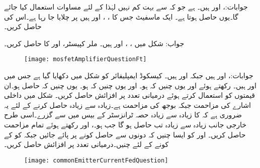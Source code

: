 جوابات:، اور  ہیں۔ ہے جو کہ  سے بہت کم نہیں لہٰذا  کے لئے مساوات  استعمال کیا جائے گا۔یوں  حاصل ہوتا ہے۔ 
ایک ماسفیٹ جس کا ، ، اور  ہیں  پر چلایا جا رہا ہے۔اس کی  حاصل کریں۔

جواب:
شکل  میں ، ،  اور  ہیں۔ ملر کپیسٹر،  اور  کا   حاصل کریں۔
\begin{figure}
\centering
\texttt{[image: mosfetAmplifierQuestionFt]}
\caption{}
\label{شکل_تعددی_ردعمل_سوال_ایف_ٹی}
\end{figure}

جوابات:،  اور ہیں جبکہ  اور  ہیں۔
کیسکوڈ ایمپلیفائر کو شکل  میں دکھایا گیا ہے جس میں  اور  ہیں۔ رکھتے ہوئے  اور  یوں چنیں کہ  ہو۔ اور  یوں چنیں کہ  ہو۔ یوں چنیں کہ  حاصل ہو۔ان قیمتوں کو استعمال کرتے ہوئے درمیانی تعدد پر افزائش  حاصل کریں۔
شکل  میں داخلی اشارے کی مزاحمت  جبکہ بوجھ کی مزاحمت  ہے۔زیادہ سے زیادہ  حاصل کرنے کے لئے یہ ضروری ہے کہ  کا زیادہ سے زیادہ حصہ ٹرانزسٹر کے بیس  میں سے گزرے۔اسی طرح خارجی جانب زیادہ سے زیادہ  تب حاصل ہو گا جب  ہو۔،  اور  رکھتے ہوئے  تمام مزاحمت حاصل کریں۔ اور  کو ایسا چنیں کہ دونوں سے حاصل کونے  پر پائے جائیں جبکہ  کو  کے کونے کے لئے چنیں۔درمیانی تعدد پر افزائش  حاصل کریں۔ 
\begin{figure}
\centering
\texttt{[image: commonEmitterCurrentFedQuestion]}
\caption{}
\label{شکل_تعددی_ردعمل_سوال_مشترک_مخارج_داخلی_اشارہ_برقی_رو}
\end{figure}

